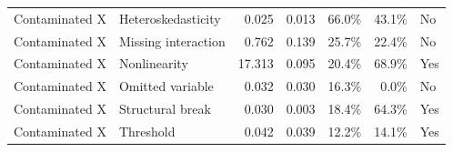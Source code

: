 \begin{table}[htbp]
{\begin{tabular}{@{}llrrrrl@{}}
Contaminated X & Heteroskedasticity & 0.025 & 0.013 & 66.0\% & 43.1\% & No \\
Contaminated X & Missing interaction & 0.762 & 0.139 & 25.7\% & 22.4\% & No \\
Contaminated X & Nonlinearity & 17.313 & 0.095 & 20.4\% & 68.9\% & Yes \\
Contaminated X & Omitted variable & 0.032 & 0.030 & 16.3\% & 0.0\% & No \\
Contaminated X & Structural break & 0.030 & 0.003 & 18.4\% & 64.3\% & Yes \\
Contaminated X & Threshold & 0.042 & 0.039 & 12.2\% & 14.1\% & Yes \\
\bottomrule
\end{tabular}%
}
\end{table}
